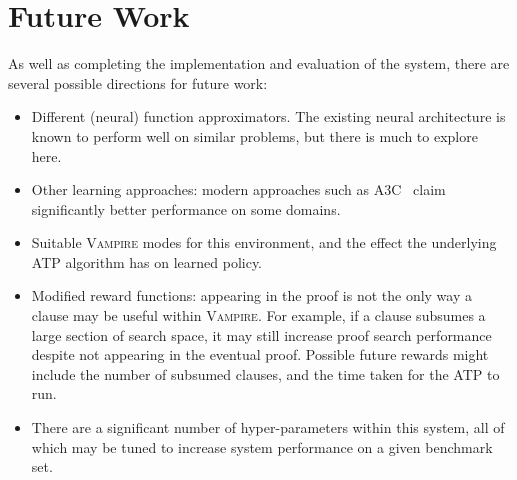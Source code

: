 \documentclass[twocolumn,a4paper,10pt]{article}
\newcommand{\vampire}{\textsc{Vampire}}
\begin{document}
\section{Future Work}
As well as completing the implementation and evaluation of the system, there are several possible directions for future work:
\begin{itemize}
	\item Different (neural) function approximators. The existing neural architecture is known to perform well on similar problems, but there is much to explore here.
	\item Other learning approaches: modern approaches such as A3C~\cite{a3c} claim significantly better performance on some domains.
	\item Suitable \vampire{} modes for this environment, and the effect the underlying ATP algorithm has on learned policy.
	\item Modified reward functions: appearing in the proof is not the only way a clause may be useful within \vampire{}. For example, if a clause subsumes a large section of search space, it may still increase proof search performance despite not appearing in the eventual proof. Possible future rewards might include the number of subsumed clauses, and the time taken for the ATP to run.
	\item There are a significant number of hyper-parameters within this system, all of which may be tuned to increase system performance on a given benchmark set.
\end{itemize}

\end{document}

